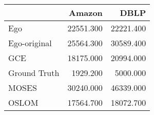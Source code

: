 \begin{tabular}{lrr}
\toprule
{} &    Amazon &      DBLP \\
\midrule
Ego          & 22551.300 & 22221.400 \\
Ego-original & 25564.300 & 30589.400 \\
GCE          & 18175.000 & 20994.000 \\
Ground Truth &  1929.200 &  5000.000 \\
MOSES        & 30240.000 & 46339.000 \\
OSLOM        & 17564.700 & 18072.700 \\
\bottomrule
\end{tabular}
